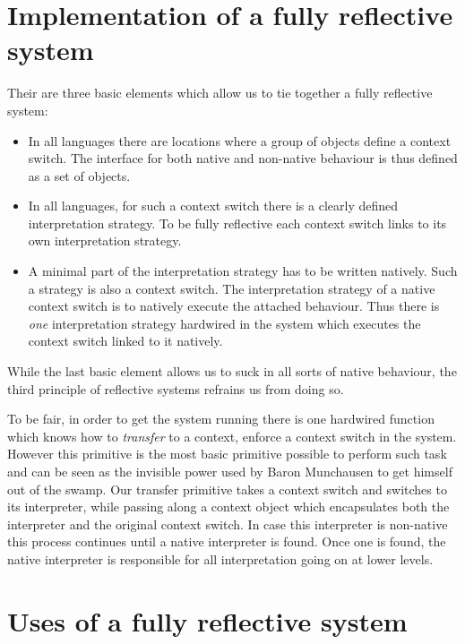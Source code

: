 \documentclass{article}
\begin{document}
\section{Implementation of a fully reflective system}
Their are three basic elements which allow us to tie together a fully
reflective system:

\begin{itemize}
    \item In all languages there are locations where a group of
          objects define a context switch. The interface for both
          native and non-native behaviour is thus defined as a set of
          objects.
    \item In all languages, for such a context switch there is a
          clearly defined interpretation strategy. To be fully
          reflective each context switch links to its own
          interpretation strategy.
    \item A minimal part of the interpretation strategy has to be
          written natively. Such a strategy is also a context switch.
          The interpretation strategy of a native context switch is to
          natively execute the attached behaviour. Thus there is
          \emph{one} interpretation strategy hardwired in the system
          which executes the context switch linked to it natively.
\end{itemize}

While the last basic element allows us to suck in all sorts of native
behaviour, the third principle of reflective systems refrains us from
doing so. 

To be fair, in order to get the system running there is one hardwired
function which knows how to \emph{transfer} to a context, \ie enforce
a context switch in the system. However this primitive is the most
basic primitive possible to perform such task and can be seen as the
invisible power used by Baron Munchausen to get himself out of the swamp.
Our transfer primitive takes a context switch and switches to its
interpreter, while passing along a context object which encapsulates both
the interpreter and the original context switch. In case this interpreter
is non-native this process continues until a native interpreter is found.
Once one is found, the native interpreter is responsible for all
interpretation going on at lower levels.

\section{Uses of a fully reflective system}
\end{document}
